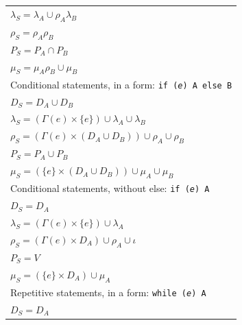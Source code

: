 \documentclass[oneside,12pt,a4paper]{book}
\begin{document}
\begin{table}[t]
\begin{tabular}{l}
$\lambda_S = \lambda_A \cup \rho_A\lambda_B$                                                \\
$\rho_S = \rho_A\rho_B$                                                                     \\
$P_S = P_A \cap P_B$                                                                        \\
$\mu_S = \mu_A\rho_B \cup \mu_B$                                                            \\
\hline                                                                                      
Conditional statements, in a form: \texttt{if (\textit{e}) A else B}                        \\
$D_S = D_A \cup D_B$                                                                        \\
$\lambda_S = (\Gamma(e) \times \{e\}) \cup \lambda_A \cup \lambda_B$                        \\
$\rho_S = (\Gamma(e) \times (D_A \cup D_B)) \cup \rho_A \cup \rho_B$                        \\
$P_S = P_A \cup P_B$                                                                        \\
$\mu_S = (\{e\} \times (D_A \cup D_B)) \cup \mu_A \cup \mu_B$                               \\
\hline                                                                                      
Conditional statements, without else: \texttt{if (\textit{e}) A}                            \\
$D_S = D_A$                                                                                 \\
$\lambda_S = (\Gamma(e) \times \{e\}) \cup \lambda_A$                                       \\
$\rho_S = (\Gamma(e) \times D_A) \cup \rho_A \cup \iota$                                    \\
$P_S = V$                                                                                   \\
$\mu_S = (\{e\} \times D_A) \cup \mu_A$                                                     \\
\hline                                                                                      
Repetitive statements, in a form: \texttt{while (\textit{e}) A}                             \\
$D_S = D_A$                                                                                 \\

\end{tabular}
\end{table}
\end{document}
